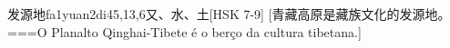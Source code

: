 \begin{EntryWithPhonetic}{发源地}{fa1yuan2di4}{5,13,6}{⼜、⽔、⼟}[HSK 7-9]
  [青藏高原是藏族文化的发源地。===O Planalto Qinghai-Tibete é o berço da cultura tibetana.]
\end{EntryWithPhonetic}
